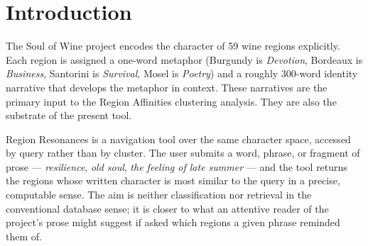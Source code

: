 \documentclass[11pt]{article}
\begin{document}

\begin{abstract}
Wine regions are conventionally indexed by geography, grape, and appellation. Region Resonances is a query tool that introduces a complementary index: the cultural and sensory character of the place itself, as expressed in the project's Layer 1 identity narratives. The user submits a word, phrase, or fragment of prose; the tool returns the regions whose written character is most semantically similar to the query. Each of the 59 region passages (a one-word metaphor concatenated with a 280--320 word identity narrative) is converted, once and in advance, into a 1{,}536-dimensional semantic embedding using OpenAI's \texttt{text-embedding-3-small} model. At query time, the user's text is embedded by the same model; cosine similarity is computed against each region embedding; the top five results are returned. A clip-and-rescale transformation maps the empirical operating range $[0.15, 0.70]$ of cosine similarity onto a $[0, 100]$ display scale that preserves the underlying ranking and remains affine within the operating range. The framework is presented here as a fully specified semantic retrieval system over a small, locked corpus, with the operating characteristics, calibration choices, and worked examples needed to interpret its output responsibly.
\end{abstract}

\section{Introduction}

The Soul of Wine project encodes the character of 59 wine regions explicitly. Each region is assigned a one-word metaphor (Burgundy is \emph{Devotion}, Bordeaux is \emph{Business}, Santorini is \emph{Survival}, Mosel is \emph{Poetry}) and a roughly 300-word identity narrative that develops the metaphor in context. These narratives are the primary input to the Region Affinities clustering analysis. They are also the substrate of the present tool.

Region Resonances is a navigation tool over the same character space, accessed by query rather than by cluster. The user submits a word, phrase, or fragment of prose --- \emph{resilience}, \emph{old soul}, \emph{the feeling of late summer} --- and the tool returns the regions whose written character is most similar to the query in a precise, computable sense. The aim is neither classification nor retrieval in the conventional database sense; it is closer to what an attentive reader of the project's prose might suggest if asked which regions a given phrase reminded them of.
\end{document}
